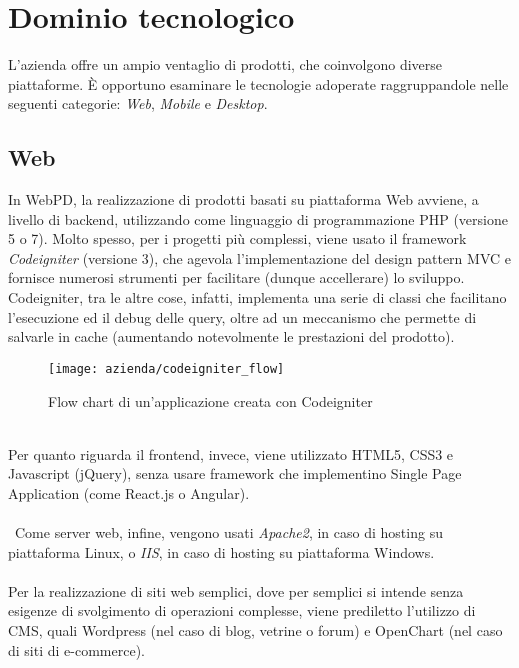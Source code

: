 \section{Dominio tecnologico}
L'azienda offre un ampio ventaglio di prodotti, che coinvolgono diverse piattaforme. È opportuno esaminare le tecnologie adoperate raggruppandole nelle seguenti categorie: \textit{Web}, \textit{Mobile} e \textit{Desktop}.

\subsection{Web}
In WebPD, la realizzazione di prodotti basati su piattaforma Web avviene, a livello di backend, utilizzando come linguaggio di programmazione PHP (versione 5 o 7). Molto spesso, per i progetti più complessi, viene usato il framework \textit{Codeigniter} (versione 3), che agevola l'implementazione del design pattern MVC e fornisce numerosi strumenti per facilitare (dunque accellerare) lo sviluppo. Codeigniter, tra le altre cose, infatti, implementa una serie di classi che facilitano l'esecuzione ed il debug delle query, oltre ad un meccanismo che permette di salvarle in cache (aumentando notevolmente le prestazioni del prodotto).\\
\begin{figure}[!h] 
	\centering 
	\texttt{[image: azienda/codeigniter\_flow]} 
	\caption{Flow chart di un'applicazione creata con Codeigniter}
\end{figure}\\
Per quanto riguarda il frontend, invece, viene utilizzato HTML5, CSS3 e Javascript (jQuery), senza usare framework che implementino Single Page Application (come React.js o Angular).\\\\\
Come server web, infine, vengono usati \textit{Apache2}, in caso di hosting su piattaforma Linux, o  \textit{IIS}, in caso di hosting su piattaforma Windows.\\\\
Per la realizzazione di siti web semplici, dove per semplici si intende senza esigenze di svolgimento di operazioni complesse, viene prediletto l'utilizzo di CMS, quali Wordpress (nel caso di blog, vetrine o forum) e OpenChart (nel caso di siti di e-commerce).
\\
\\
